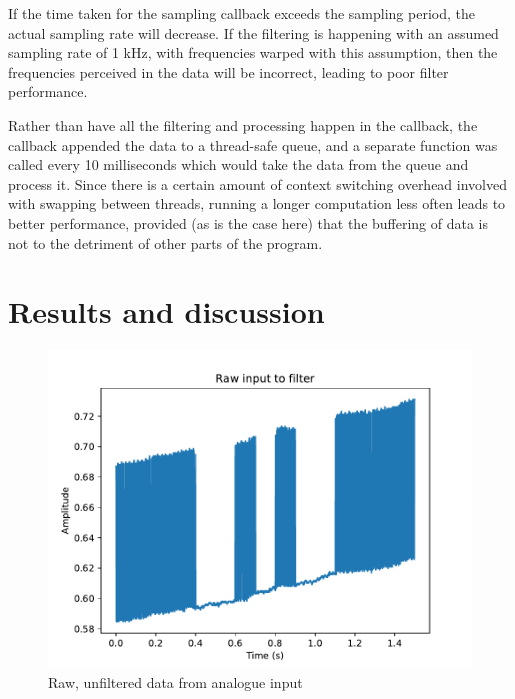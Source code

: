 \documentclass{article}
\begin{document}
\begin{multicols}{2}
If the time taken for the sampling callback exceeds the sampling period, the actual sampling rate will decrease. If the filtering is happening with an assumed sampling rate of 1 kHz, with frequencies warped with this assumption, then the frequencies perceived in the data will be incorrect, leading to poor filter performance.

Rather than have all the filtering and processing happen in the callback, the callback appended the data to a thread-safe queue, and a separate function was called every 10 milliseconds which would take the data from the queue and process it. Since there is a certain amount of context switching overhead involved with swapping between threads, running a longer computation less often leads to better performance, provided (as is the case here) that the buffering of data is not to the detriment of other parts of the program. 

\section{Results and discussion}
\begin{figure}[H]
    \includegraphics[width=\linewidth]{figures/raw.pdf}
    \caption{Raw, unfiltered data from analogue input}
    \label{fig:raw}
\end{figure}


\end{multicols}
\end{document}
